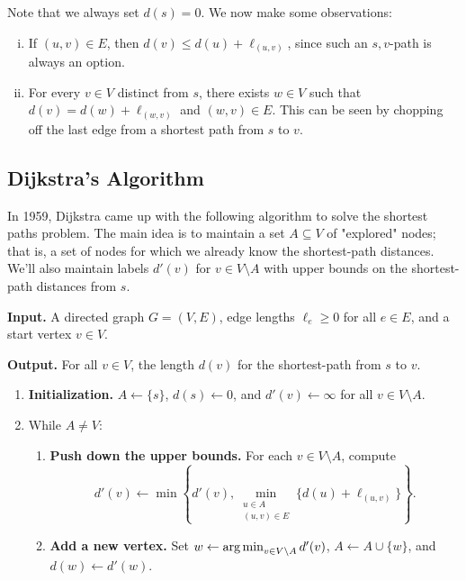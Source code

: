 Note that we always set $d(s) = 0$. We now make some observations: 
\begin{enumerate}[(i)]
    \item If $(u, v) \in E$, then $d(v) \leq d(u) + \ell_{(u,v)}$, since 
    such an $s, v$-path is always an option.
    \item For every $v \in V$ distinct from $s$, there exists $w \in V$ 
    such that $d(v) = d(w) + \ell_{(w, v)}$ and $(w, v) \in E$. This can 
    be seen by chopping off the last edge from a shortest path from $s$ to $v$.
\end{enumerate}

\subsection{Dijkstra's Algorithm}\label{subsec:1.3}
In 1959, Dijkstra came up with the following algorithm to solve the 
shortest paths problem. The main idea is to maintain a set $A \subseteq V$ 
of "explored" nodes; that is, a set of nodes for which we already know the 
shortest-path distances. We'll also maintain labels $d'(v)$ for $v \in 
V \setminus A$ with upper bounds on the shortest-path distances from $s$. 

{\bf Input.} A directed graph $G = (V, E)$, edge lengths $\ell_e \geq 0$ for 
all $e \in E$, and a start vertex $v \in V$. 

{\bf Output.} For all $v \in V$, the length $d(v)$ for the shortest-path from 
$s$ to $v$.
\begin{enumerate}[leftmargin=1.75cm, label={Step \arabic*.}]
    \item {\bf Initialization.} $A \gets \{s\}$, $d(s) \gets 0$, and $d'(v) \gets \infty$ 
    for all $v \in V \setminus A$.

    \item While $A \neq V$:
    \begin{enumerate}[label={Step 2.\arabic*.}]
        \item {\bf Push down the upper bounds.} For each $v \in V \setminus A$, compute 
        \[ d'(v) \gets \min\left\{ d'(v), \min_{\substack{u\in A \\ (u, v) \in E}} 
        \{ d(u) + \ell_{(u, v)} \} \right\}. \] 
        \item {\bf Add a new vertex.} Set $w \gets \operatorname*{arg\,min}_{v \in V \setminus A} d'(v)$, 
        $A \gets A \cup \{w\}$, and $d(w) \gets d'(w)$. 
    \end{enumerate}
\end{enumerate}

